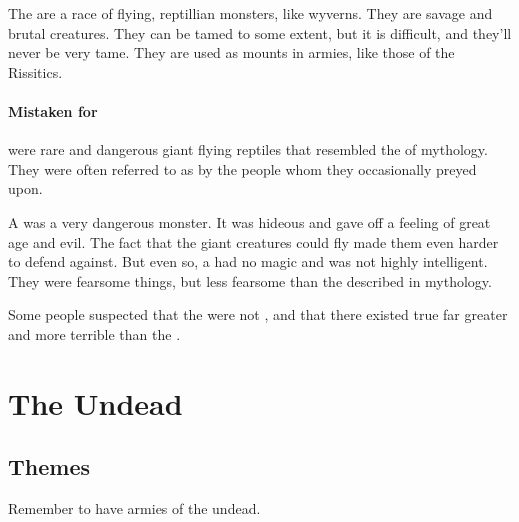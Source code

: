 The \vreiiden{} are a race of flying, reptillian monsters, like wyverns. They are savage and brutal creatures. They can be tamed to some extent, but it is difficult, and they'll never be very tame. They are used as mounts in  armies, like those of the Rissitics. 





\subsubsection{Mistaken for \dragons}
\Vreiid were rare and dangerous giant flying reptiles that resembled the \dragons of mythology. 
They were often referred to as \dragons by the people whom they occasionally preyed upon. 

A \vreiid was a very dangerous monster.
It was hideous and gave off a feeling of great age and evil. 
The fact that the giant creatures could fly made them even harder to defend against. 
But even so, a \vreiid had no magic and was not highly intelligent. 
They were fearsome things, but less fearsome than the \dragons described in mythology.

Some people suspected that the \vreiiden were not \dragons, and that there existed true \dragons far greater and more terrible than the \vreiiden. 

























\chapter{The Undead}















\section{Themes}
Remember to have armies of the undead.

